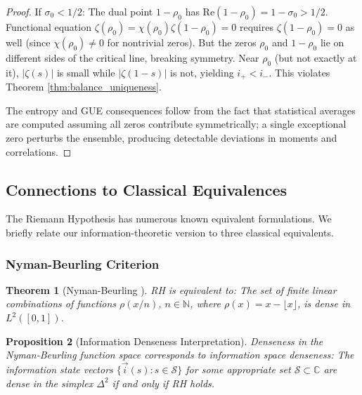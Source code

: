 \documentclass[12pt]{article}
\theoremstyle{plain}
\newtheorem{theorem}{Theorem}[section]
\newtheorem{proposition}[theorem]{Proposition}
\theoremstyle{definition}
\begin{document}
\begin{proof}
If $\sigma_0 < 1/2$: The dual point $1 - \rho_0$ has $\text{Re}(1-\rho_0) = 1 - \sigma_0 > 1/2$. Functional equation $\zeta(\rho_0) = \chi(\rho_0) \zeta(1-\rho_0) = 0$ requires $\zeta(1-\rho_0) = 0$ as well (since $\chi(\rho_0) \neq 0$ for nontrivial zeros). But the zeros $\rho_0$ and $1-\rho_0$ lie on different sides of the critical line, breaking symmetry. Near $\rho_0$ (but not exactly at it), $|\zeta(s)|$ is small while $|\zeta(1-s)|$ is not, yielding $i_+ < i_-$. This violates Theorem \ref{thm:balance_uniqueness}.

The entropy and GUE consequences follow from the fact that statistical averages are computed assuming all zeros contribute symmetrically; a single exceptional zero perturbs the ensemble, producing detectable deviations in moments and correlations.
\end{proof}

\subsection{Connections to Classical Equivalences}

The Riemann Hypothesis has numerous known equivalent formulations. We briefly relate our information-theoretic version to three classical equivalents.

\subsubsection{Nyman-Beurling Criterion}

\begin{theorem}[Nyman-Beurling \cite{beurling1955}]
RH is equivalent to: The set of finite linear combinations of functions $\rho(x/n)$, $n \in \mathbb{N}$, where $\rho(x) = x - \lfloor x \rfloor$, is dense in $L^2([0,1])$.
\end{theorem}

\begin{proposition}[Information Denseness Interpretation]\label{prop:nyman_info}
Denseness in the Nyman-Beurling function space corresponds to \emph{information space denseness}: The information state vectors $\{\vec{i}(s) : s \in \mathcal{S}\}$ for some appropriate set $\mathcal{S} \subset \mathbb{C}$ are dense in the simplex $\Delta^2$ if and only if RH holds.
\end{proposition}
\end{document}
